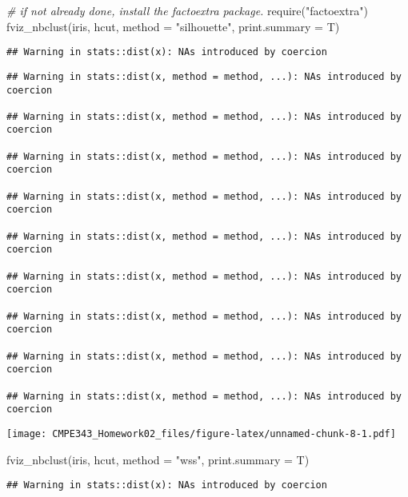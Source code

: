 \documentclass[
]{article}
\newenvironment{Shaded}{\begin{snugshade}}{\end{snugshade}}
\newcommand{\AttributeTok}[1]{\textcolor[rgb]{0.77,0.63,0.00}{#1}}
\newcommand{\CommentTok}[1]{\textcolor[rgb]{0.56,0.35,0.01}{\textit{#1}}}
\newcommand{\FunctionTok}[1]{\textcolor[rgb]{0.00,0.00,0.00}{#1}}
\newcommand{\NormalTok}[1]{#1}
\newcommand{\StringTok}[1]{\textcolor[rgb]{0.31,0.60,0.02}{#1}}
\begin{document}
\begin{Shaded}
\begin{Highlighting}[]
\CommentTok{\# if not already done, install the factoextra package.}
\FunctionTok{require}\NormalTok{(}\StringTok{"factoextra"}\NormalTok{)}
\FunctionTok{fviz\_nbclust}\NormalTok{(iris, hcut, }\AttributeTok{method =} \StringTok{"silhouette"}\NormalTok{, }\AttributeTok{print.summary =}\NormalTok{ T)}
\end{Highlighting}
\end{Shaded}

\begin{verbatim}
## Warning in stats::dist(x): NAs introduced by coercion
\end{verbatim}

\begin{verbatim}
## Warning in stats::dist(x, method = method, ...): NAs introduced by coercion

## Warning in stats::dist(x, method = method, ...): NAs introduced by coercion

## Warning in stats::dist(x, method = method, ...): NAs introduced by coercion

## Warning in stats::dist(x, method = method, ...): NAs introduced by coercion

## Warning in stats::dist(x, method = method, ...): NAs introduced by coercion

## Warning in stats::dist(x, method = method, ...): NAs introduced by coercion

## Warning in stats::dist(x, method = method, ...): NAs introduced by coercion

## Warning in stats::dist(x, method = method, ...): NAs introduced by coercion

## Warning in stats::dist(x, method = method, ...): NAs introduced by coercion
\end{verbatim}

\texttt{[image: CMPE343\_Homework02\_files/figure-latex/unnamed-chunk-8-1.pdf]}

\begin{Shaded}
\begin{Highlighting}[]
\FunctionTok{fviz\_nbclust}\NormalTok{(iris, hcut, }\AttributeTok{method =} \StringTok{"wss"}\NormalTok{, }\AttributeTok{print.summary =}\NormalTok{ T)}
\end{Highlighting}
\end{Shaded}

\begin{verbatim}
## Warning in stats::dist(x): NAs introduced by coercion
\end{verbatim}
\end{document}
